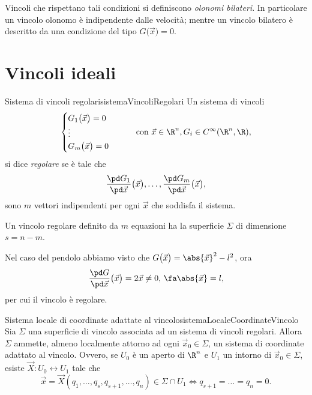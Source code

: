 \begin{notz}
	Vincoli che rispettano tali condizioni si definiscono \emph{olonomi bilateri}.
	In particolare un vincolo olonomo è indipendente dalle velocità; mentre un vincolo bilatero è descritto da una condizione del tipo \(G\big(\vec{x}\big)=0\).
\end{notz}
%
%
\section{Vincoli ideali}

\begin{defn}{Sistema di vincoli regolari}{sistemaVincoliRegolari}
	Un sistema di vincoli
	\[
		\begin{cases}
			G_1\big(\vec{x}\big) = 0 \\
			\vdots                   \\
			G_m\big(\vec{x}\big) = 0
		\end{cases}
		\qquad\text{con }\vec{x}\in\R^n, G_i\in C^{\infty}(\R^n,\R),
	\]
	si dice \emph{regolare} se è tale che
	\[
		\frac{\pd G_1}{\pd\vec{x}}\big(\vec{x}\big), \ldots, \frac{\pd G_m}{\pd\vec{x}}\big(\vec{x}\big),
	\]
	sono \(m\) vettori indipendenti per ogni \(\vec{x}\) che soddisfa il sistema.
\end{defn}

\begin{oss}
	Un vincolo regolare definito da \(m\) equazioni ha la superficie \(\Sigma\) di dimensione \(s=n-m\).
\end{oss}

\begin{ese}
	Nel caso del pendolo abbiamo visto che \(G\big(\vec{x}\big) = \abs{\vec{x}}^2-l^2\), ora
	\[
		\frac{\pd G}{\pd\vec{x}}\big(\vec{x}\big) = 2\vec{x} \neq 0,\,\fa \abs{\vec{x}} = l,
	\]
	per cui il vincolo è regolare.
\end{ese}

\begin{teor}{Sistema locale di coordinate adattate al vincolo}{sistemaLocaleCoordinateVincolo}
	Sia \(\Sigma\) una superficie di vincolo associata ad un sistema di vincoli regolari.
	Allora \(\Sigma\) ammette, almeno localmente attorno ad ogni \(\vec{x}_0\in\Sigma\), un sistema di coordinate adattato al vincolo.
	Ovvero, se \(U_0\) è un aperto di \(\R^n\) e \(U_1\) un intorno di \(\vec{x}_0\in\Sigma\), esiste \(\vec{X}\colon U_0 \longleftrightarrow U_1\) tale che
	\[
		\vec{x} = \vec{X}(q_1,\ldots,q_s,q_{s+1},\ldots,q_n) \in \Sigma\cap U_1 \iff q_{s+1} = \ldots = q_n = 0.
	\]
\end{teor}

